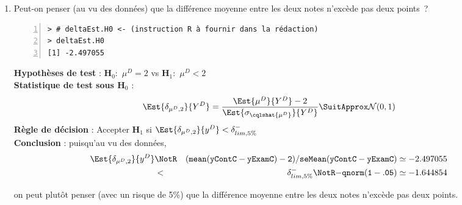 \documentclass[10pt]{report}
\begin{document}
\begin{exercice}
\begin{enumerate}
\begin{Correction}
on peut plutôt penser (avec un risque de 5\%) que la différence de notes entre contrôle continu et examen final (des étudiants de la section~C) est en moyenne strictement positive.
\end{Correction}


\item Peut-on penser (au vu des donn{\'e}es) que la diff{\'e}rence moyenne entre les deux notes n'exc{\`e}de pas deux points~?


\IndicR
\begin{Verbatim}[frame=leftline,fontfamily=tt,fontshape=n,numbers=left]
> # deltaEst.H0 <- (instruction R à fournir dans la rédaction)
> deltaEst.H0
[1] -2.497055
\end{Verbatim}

 

\begin{Correction}

\noindent \textbf{Hypothèses de test} : $\mathbf{H}_0:$ $\mu^{D}=2$ vs {\large $\mathbf{H}_1:$ $\mu^{D}<2$}\\
\textbf{Statistique de test sous $\mathbf{H}_0$} :
  $$
  \Est{\delta_{\mu^{D},2}}{Y^{D}}= {\displaystyle \frac{\Est{\mu^{D}}{Y^{D}}-2}{
\Est{\sigma_{\cqlshat{\mu^{D}}}}{Y^{D}}
}} 
  \SuitApprox \mathcal{N}(0,1)
  $$
\textbf{Règle de décision} : Accepter $\mathbf{H}_1$ si 
  $\Est{\delta_{\mu^{D},2}}{y^{D}} < \delta^-_{lim,5\%}$\\
\noindent \textbf{Conclusion} :
puisqu'au vu des données, 
  \begin{eqnarray*}
\Est{\delta_{\mu^{D},2}}{y^{D}} &\NotR&\mathtt{(mean(yContC-yExamC)-2)/seMean(yContC-yExamC)}\simeq -2.497055\\& <  & \delta^-_{lim,5\%} \NotR \mathtt{-qnorm(1-.05)}\simeq-1.644854
\end{eqnarray*}
  
on peut plutôt penser (avec un risque de 5\%) que la différence moyenne entre les deux notes n'excède pas deux points.
\end{Correction}


\end{enumerate}









\end{exercice}
\end{document}
